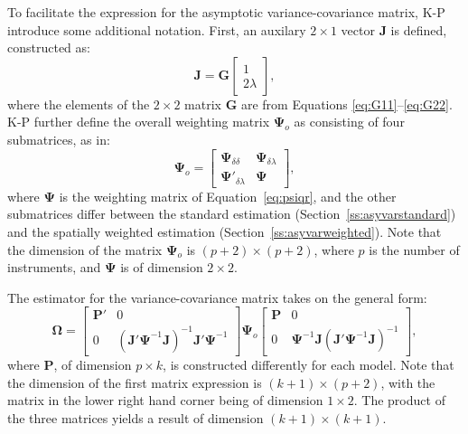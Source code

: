 \documentclass{article}
\begin{document}
To facilitate the expression for the asymptotic variance-covariance matrix,
K-P introduce some additional notation. First, an auxilary $2 \times 1$ vector $\mathbf{J}$
is defined, constructed as:
\begin{equation}\label{eq:J}
\mathbf{J} = \mathbf{G}
\left[
\begin{matrix}
1 \\
2 \lambda
\end{matrix}
\right],
\end{equation}
where the elements of the $2 \times 2$ matrix $\mathbf{G}$ are from Equations
\ref{eq:G11}--\ref{eq:G22}.
K-P further define the overall weighting matrix $\mathbf{\mathbf{\Psi}}_o$ as consisting of four
submatrices, as in:
\begin{equation*}
\mathbf{\mathbf{\Psi}}_o =
\left[
\begin{matrix}
\mathbf{\Psi}_{\delta \delta} & \mathbf{\Psi}_{\delta \lambda}\\
\mathbf{\Psi}'_{\delta \lambda} & \mathbf{\Psi}
\end{matrix}
\right],
\end{equation*}
where $\mathbf{\Psi}$ is the weighting matrix of Equation~\ref{eq:psiqr}, and the other
submatrices differ between the standard estimation (Section~\ref{ss:asyvarstandard})
and the spatially weighted estimation (Section~\ref{ss:asyvarweighted}). Note that the 
dimension of the matrix $\mathbf{\Psi}_o$ is $(p + 2) \times (p + 2)$, where $p$ is the
number of instruments, and $\mathbf{\Psi}$ is of dimension
$2 \times 2$.

The estimator for the variance-covariance matrix takes on the general form:
\begin{equation}\label{eq:genericOmega}
\mathbf{\Omega} =
\left[
\begin{matrix}
\mathbf{P'} & 0\\
0 & (\mathbf{J'} \mathbf{\Psi}^{-1} \mathbf{J} )^{-1} \mathbf{J'} \mathbf{\Psi}^{-1} 
\end{matrix}
\right]
\mathbf{\Psi}_o
\left[
\begin{matrix}
\mathbf{P} & 0\\
0 &  \mathbf{\Psi}^{-1} \mathbf{J}  (\mathbf{J'} \mathbf{\Psi}^{-1} \mathbf{J} )^{-1}  
\end{matrix}
\right],
\end{equation}
where $\mathbf{P}$, of dimension $p \times k$, is constructed differently for each model.
Note that the dimension of the first matrix expression is $(k + 1) \times (p + 2)$, with
the matrix in the lower right hand corner being of dimension $1 \times 2$. The product
of the three matrices yields a result of dimension $(k + 1) \times (k + 1)$.
\end{document}
